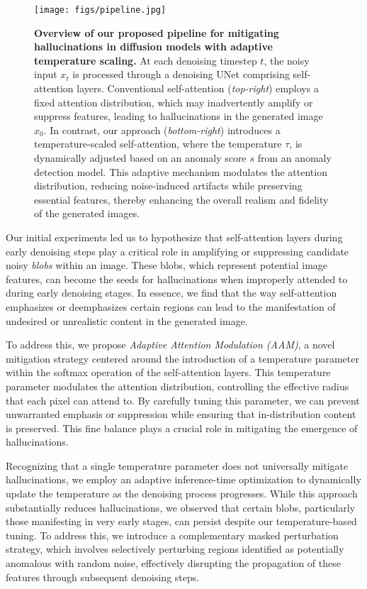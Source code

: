 \begin{figure*}[t]
    \centering
    \texttt{[image: figs/pipeline.jpg]}
    \caption{\textbf{Overview of our proposed pipeline for mitigating hallucinations in diffusion models with adaptive temperature scaling.} At each denoising timestep $t$, the noisy input $x_t$ is processed through a denoising UNet comprising self-attention layers. Conventional self-attention (\textit{top-right}) employs a fixed attention distribution, which may inadvertently amplify or suppress features, leading to hallucinations in the generated image $x_0$. In contrast, our approach (\textit{bottom-right}) introduces a temperature-scaled self-attention, where the temperature $\tau$, is dynamically adjusted based on an anomaly score $s$ from an anomaly detection model. This adaptive mechanism modulates the attention distribution, reducing noise-induced artifacts while preserving essential features, thereby enhancing the overall realism and fidelity of the generated images. }
    \label{fig:pipeline}
    \vspace{-5pt}
\end{figure*}

Our initial experiments led us to hypothesize that self-attention layers during early denoising steps play a critical role in amplifying or suppressing candidate noisy \textit{blobs} within an image.
These blobs, which represent potential image features, can become the seeds for hallucinations when improperly attended to during early denoising stages. 
In essence, we find that the way self-attention emphasizes or deemphasizes certain regions can lead to the manifestation of undesired or unrealistic content in the generated image.

To address this, we propose \textit{Adaptive Attention Modulation (AAM)}, a novel mitigation strategy centered around the introduction of a temperature parameter within the softmax operation of the self-attention layers.
This temperature parameter modulates the attention distribution, controlling the effective radius that each pixel can attend to. 
By carefully tuning this parameter, we can prevent unwarranted emphasis or suppression while ensuring that in-distribution content is preserved. 
This fine balance plays a crucial role in mitigating the emergence of hallucinations.

Recognizing that a single temperature parameter does not universally mitigate hallucinations, we employ an adaptive inference-time optimization to dynamically update the temperature as the denoising process progresses. 
While this approach substantially reduces hallucinations, we observed that certain blobs, particularly those manifesting in very early stages, can persist despite our temperature-based tuning. 
To address this, we introduce a complementary masked perturbation strategy, which involves selectively perturbing regions identified as potentially anomalous with random noise, effectively disrupting the propagation of these features through subsequent denoising steps.


